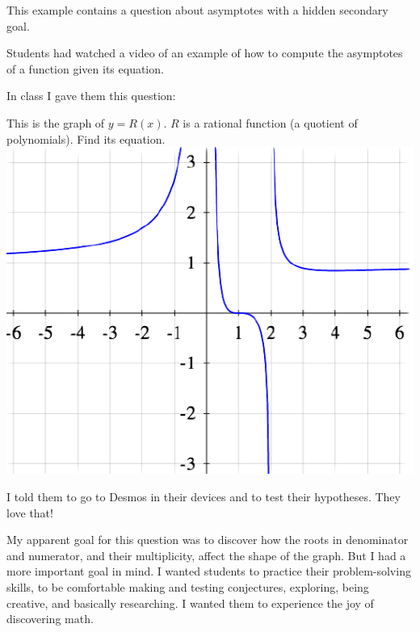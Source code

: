 \documentclass[11pt]{article}
\begin{document}
\begin{example}
This example contains a question about asymptotes with a hidden secondary goal.

\begin{background}
Students had watched a video of an example of how to compute the asymptotes of a function given its equation. 
\end{background}
\begin{question}
In class I gave them this question:
\begin{center}
This is the graph of $y = R(x)$. $R$ is a rational function (a quotient of polynomials). Find its equation.\\

\vspace{3mm}
	\includegraphics[scale=.45]{EX4}
\end{center}
I told them to go to Desmos in their devices and to test their hypotheses.  They love that!
\end{question}
\begin{comments}
{\baselineskip
My apparent goal for this question was to discover how the roots in denominator and numerator, and their multiplicity, affect the shape of the graph.  But I had a more important goal in mind.  I wanted students to practice their problem-solving skills, to be comfortable making and testing conjectures, exploring, being creative, and basically researching.  I wanted them to experience the joy of discovering math.

}
\end{comments}
\end{example}
\end{document}
